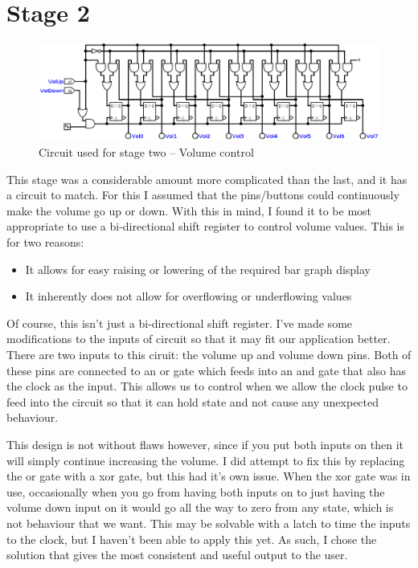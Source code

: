 \documentclass[11pt]{scrartcl}
\begin{document}
\section*{Stage 2}
\begin{figure}
    \centering
    \includegraphics[scale=0.372]{images/stagetwo.png}
    \caption{Circuit used for stage two -- Volume control}
\end{figure}
This stage was a considerable amount more complicated than the last, and it has a circuit
to match. For this I assumed that the pins/buttons could continuously make the volume go
up or down. With this in mind, I found it to be most appropriate to use a bi-directional
shift register to control volume values. This is for two reasons:

\begin{itemize}
    \item It allows for easy raising or lowering of the required bar graph display
    \item It inherently does not allow for overflowing or underflowing values
\end{itemize}

Of course, this isn't just a bi-directional shift register. I've made some modifications to
the inputs of circuit so that it may fit our application better. There are two inputs to
this ciruit: the volume up and volume down pins. Both of these pins are connected to an
or gate which feeds into an and gate that also has the clock as the input. This allows us
to control when we allow the clock pulse to feed into the circuit so that it can hold state
and not cause any unexpected behaviour.

\bigskip

This design is not without flaws however, since if you put both inputs on then it will simply
continue increasing the volume. I did attempt to fix this by replacing the or gate with a
xor gate, but this had it's own issue. When the xor gate was in use, occasionally when you go
from having both inputs on to just having the volume down input on it would go all the way to
zero from any state, which is not behaviour that we want. This may be solvable with a latch
to time the inputs to the clock, but I haven't been able to apply this yet. As such, I chose
the solution that gives the most consistent and useful output to the user.
\end{document}
